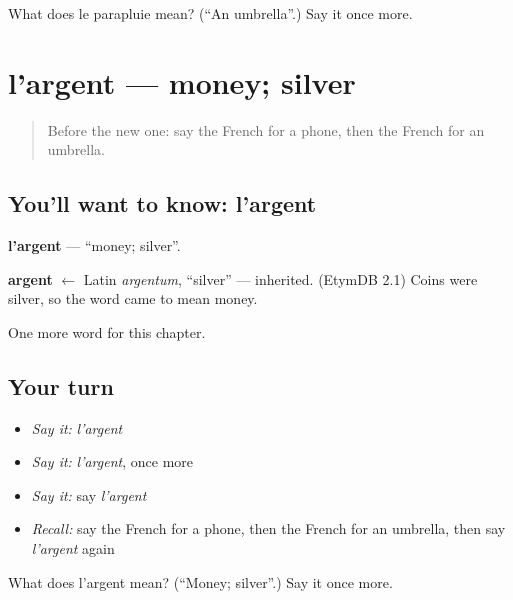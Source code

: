 \begin{tcolorbox}[breakable,colback=teal!4,colframe=teal!35!black,title={Before you move on}]
What does le parapluie mean? (\textquotedblleft{}An umbrella\textquotedblright{}.) Say it once more.
\end{tcolorbox}
\section[l'argent]{l'argent — money; silver}

\label{lesson:FR-C79-argent}



\begin{quote}
Before the new one: say the French for a phone, then the French for an umbrella.
\end{quote}

\subsection*{You'll want to know: l'argent}
\textbf{l'argent} — \textquotedblleft{}money; silver\textquotedblright{}.

\begin{cousinweb}
\textbf{argent} $\leftarrow$ Latin \emph{argentum}, \textquotedblleft{}silver\textquotedblright{} — inherited. (EtymDB 2.1) Coins were silver, so the word came to mean money.
\end{cousinweb}

\begin{grammarlens}[title={What you've built}]
One more word for this chapter.
\end{grammarlens}

\subsection*{Your turn}
\begin{itemize}
\raggedright
  \item \emph{Say it:} \emph{l'argent}
  \item \emph{Say it:} \emph{l'argent}, once more
  \item \emph{Say it:} say \emph{l'argent}
  \item \emph{Recall:} say the French for a phone, then the French for an umbrella, then say \emph{l'argent} again
\end{itemize}

\begin{tcolorbox}[breakable,colback=teal!4,colframe=teal!35!black,title={Before you move on}]
What does l'argent mean? (\textquotedblleft{}Money; silver\textquotedblright{}.) Say it once more.
\end{tcolorbox}
